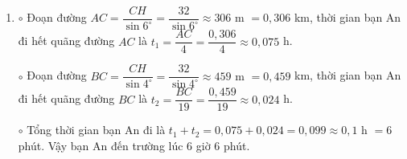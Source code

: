 \begin{ex}
{\begin{enumerate}
\begin{enumerate}
		Từ $(1)$ và $(2)$ ta có $AB=AH+BH=\dfrac{CH}{\tan 6^{\circ}}+\dfrac{CH}{\tan 4^{\circ}}\Leftrightarrow 762=CH\left(\dfrac{1}{\tan 6^{\circ}}+\dfrac{1}{\tan 4^{\circ}}\right)\Leftrightarrow CH=762: \left(\dfrac{1}{\tan 6^{\circ}}+\dfrac{1}{\tan 4^{\circ}}\right)\approx 32$ m. 
		\item $\circ$ Đoạn đường $AC=\dfrac{CH}{\sin 6^{\circ}}=\dfrac{32}{\sin 6^{\circ}}\approx 306 \text{ m }=0,306$ km, thời gian bạn An đi hết quãng đường $AC$ là $t_1=\dfrac{AC}{4}=\dfrac{0,306}{4}\approx 0,075$ h.
		
		$\circ$ Đoạn đường $BC=\dfrac{CH}{\sin 4^{\circ}}=\dfrac{32}{\sin 4^{\circ}}\approx 459\text{ m }=0,459$ km, thời gian bạn An đi hết quãng đường $BC$ là $t_2=\dfrac{BC}{19}=\dfrac{0,459}{19}\approx 0,024$ h. 
		
		$\circ$ Tổng thời gian bạn An đi là $t_1+t_2=0,075+0,024=0,099\approx 0,1$ h $=6$ phút. Vậy bạn An đến trường lúc $6$ giờ $6$ phút.
	\end{enumerate}
\end{enumerate}
}
\end{ex}

